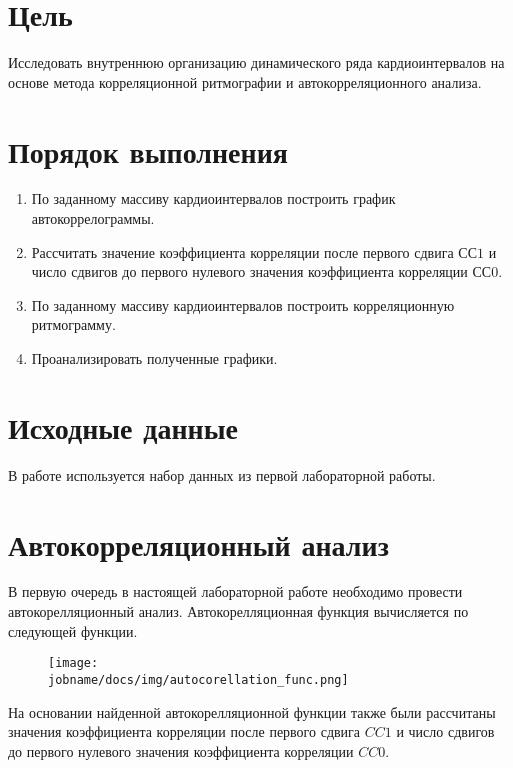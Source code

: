 \section*{Цель}

Исследовать внутреннюю организацию динамического ряда кардиоинтервалов на основе метода корреляционной ритмографии
и автокорреляционного анализа.

\section*{Порядок выполнения}

\begin{enumerate}
    \item По заданному массиву кардиоинтервалов построить график автокоррелограммы.
    \item Рассчитать значение коэффициента корреляции после первого сдвига $СС1$ и число сдвигов до первого нулевого значения коэффициента корреляции $СС0$.
    \item По заданному массиву кардиоинтервалов построить корреляционную ритмограмму.
    \item Проанализировать полученные графики.
\end{enumerate}

\section*{Исходные данные}

В работе используется набор данных из первой лабораторной работы.

\newpage

\section*{Автокорреляционный анализ}

В первую очередь в настоящей лабораторной работе необходимо провести автокорелляционный анализ.
Автокорелляционная функция вычисляется по следующей функции.

\begin{figure}[h!]
    \centering
    \texttt{[image: \\jobname/docs/img/autocorellation\_func.png]}
\end{figure}

На основании найденной автокорелляционной функции также были рассчитаны значения коэффициента корреляции после
первого сдвига $CC1$ и число сдвигов до первого нулевого значения коэффициента корреляции $CC0$.

